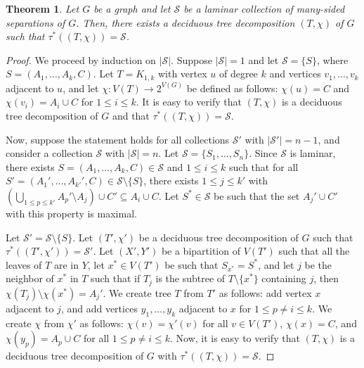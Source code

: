 \documentclass[12pt]{amsart}
\renewcommand{\S}{\mathcal{S}}
\newtheorem{theorem}{Theorem}
\begin{document}
\begin{theorem}
\label{thm:S-to-TD}
Let $G$ be a graph and let $\S$ be a laminar collection of many-sided separations of $G$. Then, there exists a deciduous tree decomposition $(T, \chi)$ of $G$ such that $\tau^*((T, \chi)) = \S$.
\end{theorem}
\begin{proof}
We proceed by induction on $|\S|$. Suppose $|\S| = 1$ and let $\S = \{S\}$, where $S = (A_1, \hdots, A_k, C)$. Let $T = K_{1, k}$ with vertex $u$ of degree $k$ and vertices $v_1, \hdots, v_k$ adjacent to $u$, and let $\chi: V(T) \to 2^{V(G)}$ be defined as follows: $\chi(u) = C$ and $\chi(v_i) = A_i \cup C$ for $1 \leq i \leq k$. It is easy to verify that $(T, \chi)$ is a deciduous tree decomposition of $G$ and that $\tau^*((T, \chi)) = \S$.

Now, suppose the statement holds for all collections $\S'$ with $|\S'| = n-1$, and consider a collection $\S$ with $|\S| = n$. Let $\S = \{S_1, \hdots, S_n\}$. Since $\S$ is laminar, there exists $S = (A_1, \hdots, A_k, C) \in \S$ and $1 \leq i \leq k$ such that for all $S' = (A_1', \hdots, A_{k'}', C
) \in \S \setminus \{S\}$, there exists $1 \leq j \leq k'$ with $\left(\bigcup_{1 \leq p \leq k'} A_p' \setminus A_j \right) \cup C' \subseteq A_i \cup C$. Let $S^* \in \S$ be such that the set $A_j' \cup C'$ with this property is maximal.


Let $\S' = \S \setminus \{S\}$. Let $(T', \chi')$ be a deciduous tree decomposition of $G$ such that $\tau^*((T', \chi')) = \S'$. Let $(X', Y')$ be a bipartition of $V(T')$ such that all the leaves of $T$ are in $Y$, let $x^* \in V(T')$ be such that $S_{x^*} = S^*$, and let $j$ be the neighbor of $x^*$ in $T$ such that if $T_j$ is the subtree of $T \setminus \{x^*\}$ containing $j$, then $\chi(T_j) \setminus \chi(x^*) = A_j'$. We create tree $T$ from $T'$ as follows: add vertex $x$ adjacent to $j$, and add vertices $y_1, \hdots, y_k$ adjacent to $x$ for $1 \leq p \neq i \leq k$. We create $\chi$ from $\chi'$ as follows: $\chi(v) = \chi'(v)$ for all $v \in V(T')$, $\chi(x) = C$, and $\chi(y_p) = A_p \cup C$ for all $1 \leq p \neq i \leq k$. Now, it is easy to verify that $(T, \chi)$ is a deciduous tree decomposition of $G$ with $\tau^*((T, \chi)) = \S$.
\end{proof}
\end{document}
